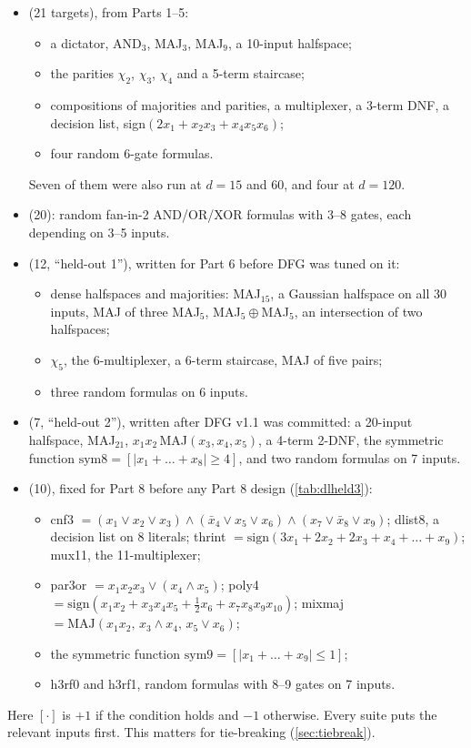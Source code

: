 \begin{itemize}
\item {} (21 targets), from Parts 1--5:
  \begin{itemize}
  \item a dictator, AND$_3$, MAJ$_3$, MAJ$_9$, a 10-input halfspace;
  \item the parities $\chi_2$, $\chi_3$, $\chi_4$ and a 5-term staircase;
  \item compositions of majorities and parities, a multiplexer, a 3-term DNF, a decision list, sign$(2x_1+x_2x_3+x_4x_5x_6)$;
  \item four random 6-gate formulas.
  \end{itemize}
  Seven of them were also run at $d=15$ and 60, and four at $d=120$.
\item {} (20): random fan-in-2 AND/OR/XOR formulas with 3--8 gates, each depending on 3--5 inputs.
\item {} (12, ``held-out 1''), written for Part 6 before DFG was tuned on it:
  \begin{itemize}
  \item dense halfspaces and majorities: MAJ$_{15}$, a Gaussian halfspace on all 30 inputs, MAJ of three MAJ$_5$, MAJ$_5\oplus$MAJ$_5$, an intersection of two halfspaces;
  \item $\chi_5$, the 6-multiplexer, a 6-term staircase, MAJ of five pairs;
  \item three random formulas on 6 inputs.
  \end{itemize}
\item {} (7, ``held-out 2''), written after DFG v1.1 was committed: a 20-input halfspace, MAJ$_{21}$, $x_1x_2\,$MAJ$(x_3,x_4,x_5)$, a 4-term 2-DNF, the symmetric function $\mathrm{sym8}=[|x_1+\dots+x_8|\ge4]$, and two random formulas on 7 inputs.
\item {} (10), fixed for Part 8 before any Part 8 design (\cref{tab:dlheld3}):
  \begin{itemize}
  \item cnf3 $=(x_1\vee x_2\vee x_3)\wedge(\bar x_4\vee x_5\vee x_6)\wedge(x_7\vee\bar x_8\vee x_9)$; dlist8, a decision list on 8 literals; thrint $=\mathrm{sign}(3x_1+2x_2+2x_3+x_4+\dots+x_9)$; mux11, the 11-multiplexer;
  \item par3or $=x_1x_2x_3\vee(x_4\wedge x_5)$; poly4 $=\mathrm{sign}(x_1x_2+x_3x_4x_5+\tfrac12x_6+x_7x_8x_9x_{10})$; mixmaj $=\mathrm{MAJ}(x_1x_2,\,x_3\wedge x_4,\,x_5\vee x_6)$;
  \item the symmetric function $\mathrm{sym9}=[|x_1+\dots+x_9|\le1]$;
  \item h3rf0 and h3rf1, random formulas with 8--9 gates on 7 inputs.
  \end{itemize}
\end{itemize}
Here $[\cdot]$ is $+1$ if the condition holds and $-1$ otherwise. Every suite puts the relevant inputs first. This matters for tie-breaking (\cref{sec:tiebreak}).

